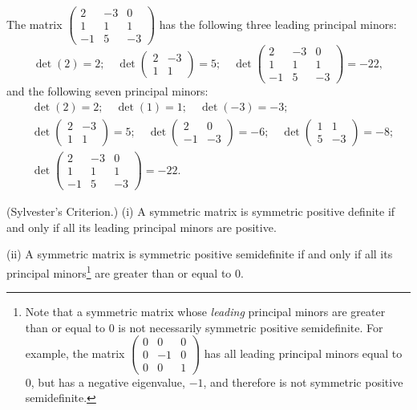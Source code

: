 \begin{examplex}
The matrix $\begin{pmatrix} 2 & -3 & 0\\ 1 & 1 & 1\\ -1 & 5 & -3 \end{pmatrix}$ has the
following three leading principal minors:
\[
\det(2) = 2; \quad \det\begin{pmatrix} 2 & -3\\ 1 & 1 \end{pmatrix} = 5; \quad
\det\begin{pmatrix} 2 & -3 & 0\\ 1 & 1 & 1\\ -1 & 5 & -3 \end{pmatrix} = -22,
\]
and the following seven principal minors:
\begin{align*}
&\det(2) = 2; \quad \det(1) = 1; \quad \det(-3) = -3;\\
&\det\begin{pmatrix} 2 & -3\\ 1 & 1 \end{pmatrix} = 5; \quad
\det\begin{pmatrix} 2 & 0\\ -1 & -3 \end{pmatrix} = -6; \quad
\det\begin{pmatrix} 1 & 1\\ 5 & -3 \end{pmatrix} = -8;\\
&\det\begin{pmatrix} 2 & -3 & 0\\ 1 & 1 & 1\\ -1 & 5 & -3 \end{pmatrix} = -22.
\end{align*}
\end{examplex}

\begin{theorem}
(Sylvester's Criterion.) (i) A symmetric matrix is symmetric positive definite if and
only if all its leading principal minors are positive.

(ii) A symmetric matrix is symmetric positive semidefinite if and only if all its
principal minors\footnote{Note that a symmetric matrix whose \textit{leading} principal
minors are greater than or equal to $0$ is not necessarily symmetric positive
semidefinite. For example, the matrix $\begin{pmatrix} 0 & 0 & 0\\ 0 & -1 & 0\\ 0 & 0 &
1 \end{pmatrix}$ has all leading principal minors equal to $0$, but has a negative
eigenvalue, $-1$, and therefore is not symmetric positive semidefinite.} are greater
than or equal to $0$.
\end{theorem}

